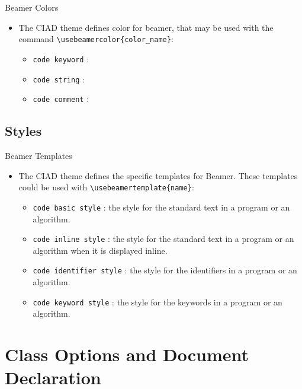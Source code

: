 \documentclass[english,sectioncirclenumberstyle]{ciadbeamer}
\begin{document}
\begin{frame}{Beamer Colors}
	\begin{itemize}
	\item The CIAD theme defines color for beamer, that may be used with the command \texttt{{\textbackslash}usebeamercolor\{color\_name\}}:
		\begin{itemize}
		\item \texttt{code keyword} : 
		\vfill
		\item \texttt{code string} : 
		\vfill
		\item \texttt{code comment} : 
		\end{itemize}
	\end{itemize}
\end{frame}

\subsection{Styles}
\begin{frame}{Beamer Templates}
	\begin{itemize}
	\item The CIAD theme defines the specific templates for Beamer. These templates could be used with 
		\texttt{{\textbackslash}usebeamertemplate\{name\}}:
		\begin{itemize}
		\item \texttt{code basic style} : the style for the standard text in a program or an algorithm. 
		\vfill
		\item \texttt{code inline style} : the style for the standard text in a program or an algorithm when it is displayed inline. 
		\vfill
		\item \texttt{code identifier style} : the style for the identifiers in a program or an algorithm. 
		\vfill
		\item \texttt{code keyword style} : the style for the keywords in a program or an algorithm. 
		\end{itemize}
	\end{itemize}
\end{frame}

\section{Class Options and Document Declaration}
\sectiontableofcontentslide
\end{document}
